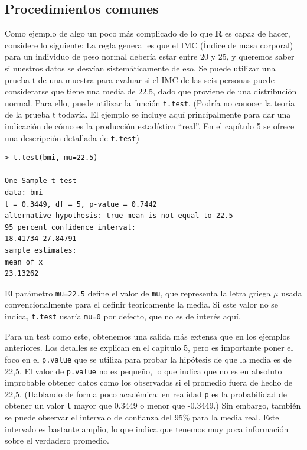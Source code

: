 \subsection{Procedimientos comunes}

Como ejemplo de algo un poco más complicado de lo que \textbf{R} es capaz de
hacer, considere lo siguiente: La regla general es que el IMC (Índice de masa
corporal) para un individuo de peso normal debería estar entre 20 y 25, y
queremos saber si nuestros datos se desvían sistemáticamente de eso. Se puede
utilizar una prueba t de una muestra para evaluar si el IMC de las seis
personas puede considerarse que tiene una media de 22,5, dado que proviene de
una distribución normal. Para ello, puede utilizar la función \texttt{t.test}.
(Podría no conocer la teoría de la prueba t todavía. El ejemplo se incluye aquí
principalmente para dar una indicación de cómo es la producción estadística
``real''. En el capítulo 5 se ofrece una descripción detallada de
\texttt{t.test})

\begin{lstlisting}[style=R]
> t.test(bmi, mu=22.5)

One Sample t-test
data: bmi
t = 0.3449, df = 5, p-value = 0.7442
alternative hypothesis: true mean is not equal to 22.5
95 percent confidence interval:
18.41734 27.84791
sample estimates:
mean of x
23.13262
\end{lstlisting}

El parámetro \texttt{mu=22.5} define el valor de \texttt{mu}, que representa la
letra griega $\mu$ usada convencionalmente para el definir teoricamente la
media. Si este valor no se indica, \texttt{t.test} usaría  \texttt{mu=0} por
defecto, que no es de interés aquí.

Para un test como este, obtenemos una salida más extensa que en los ejemplos
anteriores. Los detalles se explican en el capítulo 5, pero es importante poner
el foco en el \texttt{p.value} que se utiliza para probar la hipótesis de que
la media es de 22,5. El valor de \texttt{p.value} no es pequeño, lo que indica
que no es en absoluto improbable obtener datos como los observados si el
promedio fuera de hecho de 22,5. (Hablando de forma poco académica: en realidad
\texttt{p} es la probabilidad de obtener un valor \texttt{t} mayor que 0.3449 o
menor que -0.3449.) Sin embargo, también se puede observar el intervalo de
confianza del 95\% para la media real. Este intervalo es bastante amplio, lo que
indica que tenemos muy poca información sobre el verdadero promedio.

